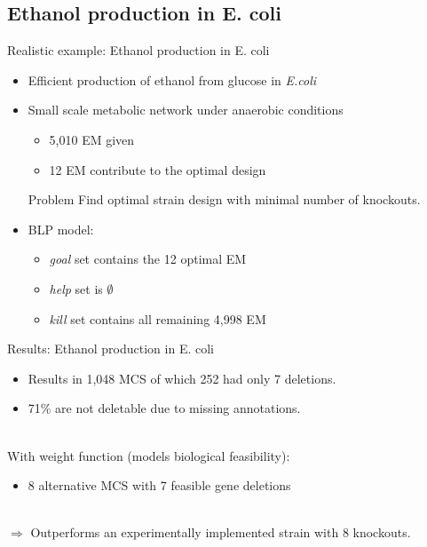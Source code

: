 \documentclass{beamer}
\begin{document}
\subsection{Ethanol production in E. coli}
\begin{frame}{Realistic example: Ethanol production in E. coli}
	\begin{itemize}
		\item Efficient production of ethanol from glucose in \emph{E.coli}
		\item Small scale metabolic network under anaerobic conditions
		\begin{itemize}
			\item 5,010 EM given
			\item 12 EM contribute to the optimal design
		\end{itemize}
\pause
	\begin{block}{Problem}
		 Find optimal strain design with minimal number of knockouts.
	\end{block}
\pause
		\item BLP model:
		\begin{itemize}
			\item \emph{goal} set contains the 12 optimal EM
			\item \emph{help} set is $\emptyset$
			\item \emph{kill} set contains all remaining 4,998 EM
		\end{itemize}
	\end{itemize}
\end{frame}

\begin{frame}{Results: Ethanol production in E. coli}
	\begin{itemize}
	\item Results in 1,048 MCS of which 252 had only 7 deletions.
	\item 71\% are not deletable due to missing annotations.
	\end{itemize}
~\\
\pause
With weight function (models biological feasibility):
	\begin{itemize}
		\item 8 alternative MCS with 7 feasible gene deletions		
	\end{itemize}
~\\
$\Rightarrow$ Outperforms an  experimentally implemented strain with 8 knockouts.
\end{frame}
\end{document}
